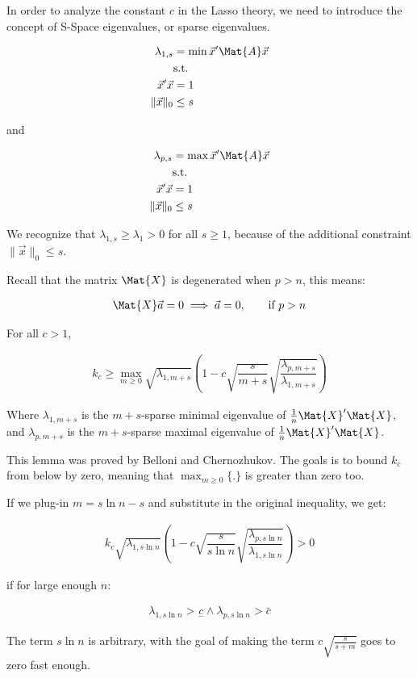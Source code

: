 In order to analyze the constant $c$ in the Lasso theory, we need to introduce the concept of S-Space eigenvalues, or sparse eigenvalues.

\begin{align*}
\lambda_{1,s} &= \min \Vec{x}'\Mat{A}\Vec{x} \\
&\text{s.t.} \\
\Vec{x}'\Vec{x} &= 1 \\
\|\Vec{x}\|_0 &\leq s
\end{align*}

and 

\begin{align*}
\lambda_{p,s} &= \max \Vec{x}'\Mat{A}\Vec{x} \\
&\text{s.t.} \\
\Vec{x}'\Vec{x} &= 1 \\
\|\Vec{x}\|_0 &\leq s
\end{align*}

We recognize that $\lambda_{1,s} \geq \lambda_{1} > 0$ for all $s \geq 1$, because of the additional constraint $\|\Vec{x}\|_0 \leq s$.

Recall that the matrix $\Mat{X}$ is degenerated when $p >n$, this means:

\begin{align*}
    \Mat{X} \Vec{a} = 0 \implies \Vec{a} = 0,\qquad \text{if } p > n
\end{align*}

\begin{lemma}
    For all $c > 1$,

\begin{align*}
k_c \geq \max_{m \geq 0} {
    \sqrt{\lambda_{1, m+s}}
    \left(
        1 - c \sqrt{\dfrac{s}{m+s}} \sqrt{\dfrac{\lambda_{p, m+s}}{\lambda_{1, m+s}}}
    \right)
}
\end{align*}

Where $\lambda_{1, m+s}$ is the $m+s$-sparse minimal eigenvalue of $\frac{1}{n}\Mat{X}'\Mat{X}$, and $\lambda_{p, m+s}$ is the $m+s$-sparse maximal eigenvalue of $\frac{1}{n}\Mat{X}'\Mat{X}$.
\end{lemma}

This lemma was proved by Belloni and Chernozhukov. The goals is to bound $k_c$ from below by zero, meaning that $\max_{m \geq 0} \{.\}$ is greater than zero too.

If we plug-in $m = s \ln n -s$ and substitute in the original inequality, we get:

\begin{align*}
k_c {
    \sqrt{\lambda_{1, s \ln n}}
    \left(
        1 - c \sqrt{\dfrac{s}{s \ln n}} \sqrt{\dfrac{\lambda_{p, s \ln n}}{\lambda_{1, s \ln n}}}
    \right)
} > 0 
\end{align*}

if for large enough $n$:

\begin{align*}
    \lambda_{1, s \ln n} > \underset{-}{c} \land \lambda_{p, s \ln n} > \bar{c}
\end{align*}

The term $s \ln n$ is arbitrary, with the goal of making the term $c \sqrt{\frac{s}{s+m}}$ goes to zero fast enough.